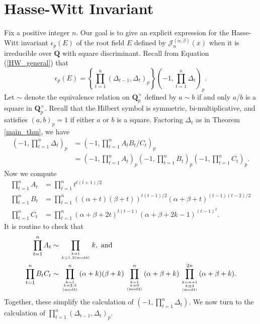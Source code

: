 \documentclass{amsart}
\newcommand{\Q}{\mathbf{Q}}
\theoremstyle{plain}
\theoremstyle{remark}
\begin{document}
\section{Hasse-Witt Invariant} \label{HW_section}

Fix a positive integer $n$.  Our goal is to give an explicit expression for the Hasse-Witt invariant $\epsilon_p(E)$ of the root field $E$ defined by $\mathscr{J}_n^{(\alpha,\beta)}(x)$ when it is irreducible over $\Q$ with square discriminant.  
Recall from Equation (\ref{HW_general}) that
\[
\epsilon_p(E) = \left\{ \prod_{t=1}^n \left( \Delta_{t-1},\Delta_{t} \right)_p \right\} \left( -1,\prod_{t=1}^n \Delta_{t} \right)_p.
\]
Let $\sim$ denote the equivalence relation on $\Q_p^\times$ defined by $a \sim b$ if and only $a/b$ is a square in $\Q_p^\times$.  Recall that the Hilbert symbol is symmetric, bi-multiplicative, and satisfies $(a,b)_p = 1$ if either $a$ or $b$ is a square.  Factoring $\Delta_{t}$ as in Theorem \ref{main_thm}, we have 
\begin{align*}
\left( -1,\prod_{t=1}^n \Delta_{t} \right)_p  &= \left( -1,\prod_{t=1}^n A_{t}B_{t}/C_{t} \right)_p \\
&=   \left( -1,\prod_{t=1}^n A_{t} \right)_p\left( -1,\prod_{t=1}^n B_{t} \right)_p\left( -1,\prod_{t=1}^n C_{t} \right)_p.
\end{align*}
Now we compute
\begin{align}
\prod_{t=1}^n A_{t} &=  \prod_{t =1}^n t^{t(t+1)/2} \\
\prod_{t=1}^n B_{t} &=  \prod_{t=1}^n \left((\alpha +t)(\beta+t)\right)^{t(t-1)/2} \left( \alpha + \beta + t \right)^{(t-1)(t-2)/2}\\
\prod_{t=1}^n C_{t} &=  \prod_{t=1}^n (\alpha + \beta + 2t)^{t(t-1)} (\alpha + \beta + 2k-1)^{(t-1)^2}.
\end{align}
It is routine to check that
\begin{align}
\prod_{t=1}^n A_{t} &\sim \prod_{k=1 \atop k \equiv 1,2 (\text{mod}{4})} k,\text{ and}  \\ 
\prod_{t=1}^n B_{t}C_{t} &\sim \prod_{k=1 \atop {k \equiv 2,3 \atop (\text{mod}{4})}}^n (\alpha+k)(\beta+k) \prod_{k=1 \atop {k \equiv 0 \atop (\text{mod}{4})}}^n (\alpha + \beta + k) \prod_{k=n+1 \atop {k \equiv 3 \atop (\text{mod}{4})}}^{2n} (\alpha + \beta + k).
\end{align}
Together, these simplify the calculation of  $\left( -1, \prod_{t=1}^n \Delta_{t}\right)$.  We now turn to the calculation of $\prod_{t=1}^n \left( \Delta_{t-1},\Delta_{t} \right)_p$.
\end{document}
